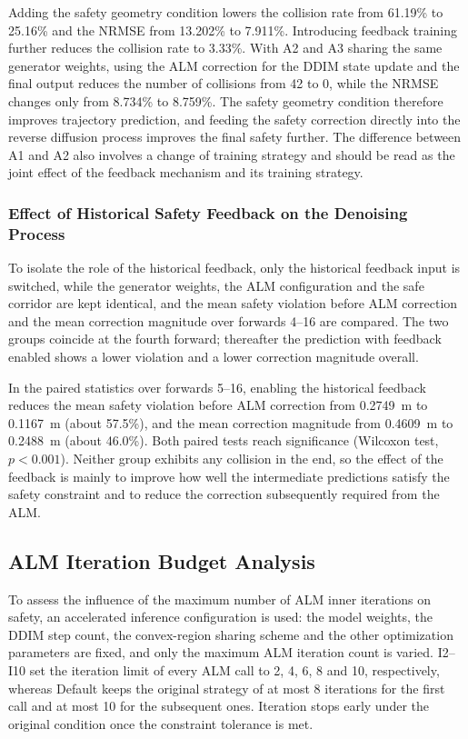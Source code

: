 \documentclass[journal]{IEEEtran}
\begin{document}
Adding the safety geometry condition lowers the collision rate from 61.19\% to
25.16\% and the NRMSE from 13.202\% to 7.911\%. Introducing feedback training
further reduces the collision rate to 3.33\%. With A2 and A3 sharing the same
generator weights, using the ALM correction for the DDIM state update and the
final output reduces the number of collisions from 42 to 0, while the NRMSE
changes only from 8.734\% to 8.759\%. The safety geometry condition therefore
improves trajectory prediction, and feeding the safety correction directly into
the reverse diffusion process improves the final safety further. The difference
between A1 and A2 also involves a change of training strategy and should be read
as the joint effect of the feedback mechanism and its training strategy.

\subsubsection{Effect of Historical Safety Feedback on the Denoising Process}
To isolate the role of the historical feedback, only the historical feedback
input is switched, while the generator weights, the ALM configuration and the
safe corridor are kept identical, and the mean safety violation before ALM
correction and the mean correction magnitude over forwards 4--16 are compared.
The two groups coincide at the fourth forward; thereafter the prediction with
feedback enabled shows a lower violation and a lower correction magnitude
overall.

In the paired statistics over forwards 5--16, enabling the historical feedback
reduces the mean safety violation before ALM correction from 0.2749~m to
0.1167~m (about 57.5\%), and the mean correction magnitude from 0.4609~m to
0.2488~m (about 46.0\%). Both paired tests reach significance (Wilcoxon test,
$p<0.001$). Neither group exhibits any collision in the end, so the effect of
the feedback is mainly to improve how well the intermediate predictions satisfy
the safety constraint and to reduce the correction subsequently required from
the ALM.

\subsection{ALM Iteration Budget Analysis}
To assess the influence of the maximum number of ALM inner iterations on safety,
an accelerated inference configuration is used: the model weights, the DDIM step
count, the convex-region sharing scheme and the other optimization parameters are
fixed, and only the maximum ALM iteration count is varied. I2--I10 set the
iteration limit of every ALM call to 2, 4, 6, 8 and 10, respectively, whereas
Default keeps the original strategy of at most 8 iterations for the first call
and at most 10 for the subsequent ones. Iteration stops early under the original
condition once the constraint tolerance is met.
\end{document}

